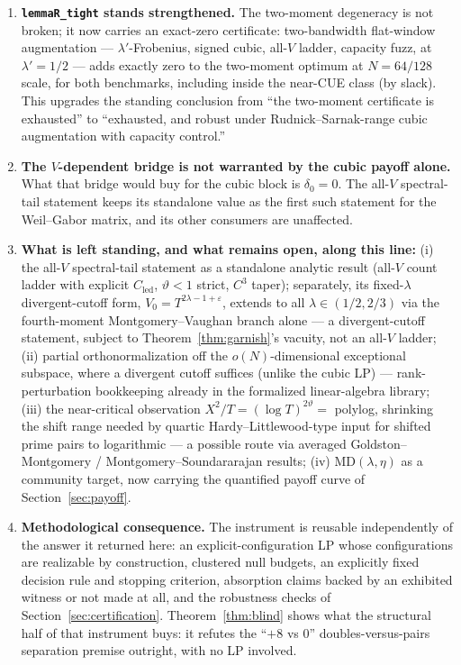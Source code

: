 \documentclass[11pt]{article}
\theoremstyle{plain}
\theoremstyle{definition}
\theoremstyle{remark}
\newcommand{\Cled}{C_{\mathrm{led}}}
\begin{document}
\begin{enumerate}
\item \textbf{\texttt{lemmaR\_tight} stands strengthened.} The two-moment
  degeneracy is not broken; it now carries an exact-zero certificate:
  two-bandwidth flat-window augmentation --- $\lambda'$-Frobenius, signed cubic,
  all-$V$ ladder, capacity fuzz, at $\lambda' = 1/2$ --- adds exactly zero to the
  two-moment optimum at $N = 64/128$ scale, for both benchmarks, including inside
  the near-CUE class (by slack). This upgrades the standing conclusion from
  ``the two-moment certificate is exhausted'' to ``exhausted, and robust under
  Rudnick--Sarnak-range cubic augmentation with capacity control.''
\item \textbf{The $V$-dependent bridge is not warranted by the cubic payoff
  alone.} What that bridge would buy for the cubic block is $\delta_0 = 0$. The
  all-$V$ spectral-tail
  statement keeps its standalone value as the first such statement for the
  Weil--Gabor matrix, and its other consumers are unaffected.
\item \textbf{What is left standing, and what remains open, along this line:}
  (i) the all-$V$ spectral-tail statement as a standalone analytic result
  (all-$V$ count ladder with explicit
  $\Cled$, $\vartheta < 1$ strict, $C^3$ taper); separately, its fixed-$\lambda$
  divergent-cutoff form,
  $V_0 = T^{2\lambda - 1 + \varepsilon}$, extends to all
  $\lambda \in (1/2, 2/3)$ via the fourth-moment Montgomery--Vaughan branch alone
  --- a divergent-cutoff
  statement, subject to Theorem~\ref{thm:garnish}'s vacuity, not an all-$V$
  ladder; (ii) partial orthonormalization off the $o(N)$-dimensional exceptional
  subspace, where a divergent cutoff suffices (unlike the cubic LP) ---
  rank-perturbation bookkeeping already in the formalized linear-algebra library;
  (iii) the near-critical observation $X^2/T = (\log T)^{2\vartheta} = $ polylog,
  shrinking the shift range needed by quartic Hardy--Littlewood-type input for
  shifted prime pairs to logarithmic --- a possible route via averaged
  Goldston--Montgomery / Montgomery--Soundararajan results; (iv)
  $\mathrm{MD}(\lambda, \eta)$ as a community target, now carrying the
  quantified payoff curve of Section~\ref{sec:payoff}.
\item \textbf{Methodological consequence.} The instrument is reusable
  independently of the answer it returned here: an explicit-configuration LP
  whose configurations are realizable by construction, clustered null
  budgets, an explicitly fixed decision rule and stopping criterion, absorption
  claims backed by an exhibited witness or not made at all, and the robustness
  checks of Section~\ref{sec:certification}. Theorem~\ref{thm:blind} shows what
  the structural half of that instrument buys: it refutes the ``$+8$ vs $0$''
  doubles-versus-pairs separation premise outright, with no LP involved.
\end{enumerate}
\end{document}
